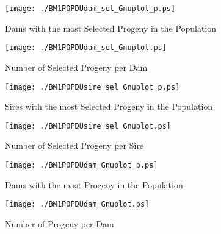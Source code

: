 \begin{figure}[h]
\begin{center}{
\caption{Dams with the most Selected Progeny in the Population}
  \texttt{[image: ./BM1POPDUdam\_sel\_Gnuplot\_p.ps]}
  }\end{center}
  \end{figure}
  

\begin{figure}[h]
\begin{center}{
\caption{Number of Selected Progeny per Dam}
  \texttt{[image: ./BM1POPDUdam\_sel\_Gnuplot.ps]}
  }\end{center}
  \end{figure}
  

\begin{figure}[h]
\begin{center}{
\caption{Sires with the most Selected Progeny in the Population}
  \texttt{[image: ./BM1POPDUsire\_sel\_Gnuplot\_p.ps]}
  }\end{center}
  \end{figure}
  

\begin{figure}[h]
\begin{center}{
\caption{Number of Selected Progeny per Sire}
  \texttt{[image: ./BM1POPDUsire\_sel\_Gnuplot.ps]}
  }\end{center}
  \end{figure}
  

\begin{figure}[h]
\begin{center}{
\caption{Dams with the most Progeny in the Population}
  \texttt{[image: ./BM1POPDUdam\_Gnuplot\_p.ps]}
  }\end{center}
  \end{figure}
  

\begin{figure}[h]
\begin{center}{
\caption{Number of Progeny per Dam }
  \texttt{[image: ./BM1POPDUdam\_Gnuplot.ps]}
  }\end{center}
  \end{figure}
  

